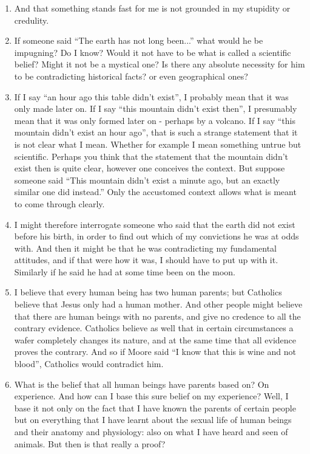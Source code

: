 \documentclass{book}
\begin{document}
\begin{enumerate}
\item
And that something stands fast for me is not grounded in my stupidity or
credulity.

\item
If someone said ``The earth has not long been...'' what would he be impugning?
Do I know?  Would it not have to be what is called a scientific belief? Might
it not be a mystical one? Is there any absolute necessity for him to be
contradicting historical facts? or even geographical ones?

\item
If I say ``an hour ago this table didn't exist'', I probably mean that it was
only made later on.  If I say ``this mountain didn't exist then'', I presumably
mean that it was only formed later on - perhaps by a volcano.  If I say ``this
mountain didn't exist an hour ago'', that is such a strange statement that it
is not clear what I mean. Whether for example I mean something untrue but
scientific. Perhaps you think that the statement that the mountain didn't exist
then is quite clear, however one conceives the context. But suppose someone
said ``This mountain didn't exist a minute ago, but an exactly similar one did
instead.'' Only the accustomed context allows what is meant to come through
clearly.

\item
I might therefore interrogate someone who said that the earth did not exist
before his birth, in order to find out which of my convictions he was at odds
with. And then it might be that he was contradicting my fundamental attitudes,
and if that were how it was, I should have to put up with it.  Similarly if he
said he had at some time been on the moon.

\item
I believe that every human being has two human parents; but Catholics believe
that Jesus only had a human mother. And other people might believe that there
are human beings with no parents, and give no credence to all the contrary
evidence. Catholics believe as well that in certain circumstances a wafer
completely changes its nature, and at the same time that all evidence proves
the contrary. And so if Moore said ``I know that this is wine and not blood'',
Catholics would contradict him.

\item
What is the belief that all human beings have parents based on? On experience.
And how can I base this sure belief on my experience? Well, I base it not only
on the fact that I have known the parents of certain people but on everything
that I have learnt about the sexual life of human beings and their anatomy and
physiology: also on what I have heard and seen of animals. But then is that
really a proof?


\end{enumerate}
\end{document}
